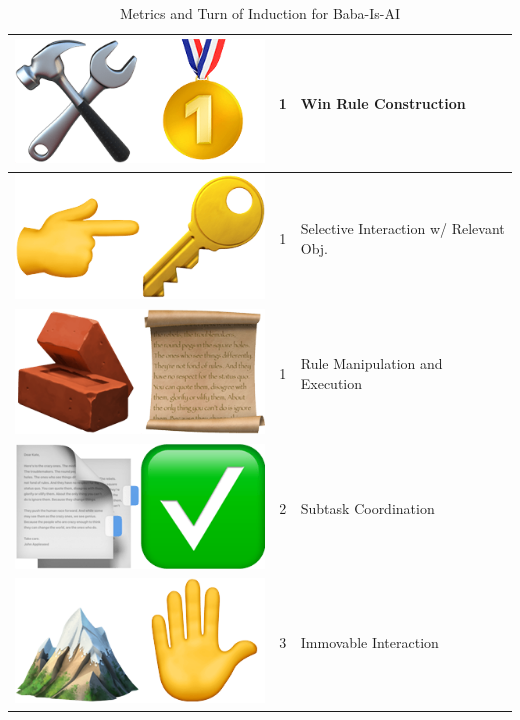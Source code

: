 \begin{table}
\begin{tabular}{ccl}
\midrule
\rowcolor{gray!30} \includegraphics[scale=0.07]{figs/emojis/emoji_5.png} & 1 & Win Rule Construction \\
\midrule
\rowcolor{gray!30} \includegraphics[scale=0.07]{figs/emojis/emoji_6.png} & 1 & Selective Interaction w/ Relevant Obj.  \\
\midrule
\rowcolor{gray!30} \includegraphics[scale=0.07]{figs/emojis/emoji_7.png} & 1 & Rule Manipulation and Execution  \\
\midrule
\rowcolor{gray!60} \includegraphics[scale=0.07]{figs/emojis/emoji_8.png} & 2 & Subtask Coordination \\
\midrule
\rowcolor{gray!90} \includegraphics[scale=0.07]{figs/emojis/emoji_9.png} & 3 & Immovable Interaction \\
\bottomrule
\end{tabular}
\caption{Metrics and Turn of Induction \newline for Baba-Is-AI}
\label{tab:baba_is_ai_metrics}
\end{table}

